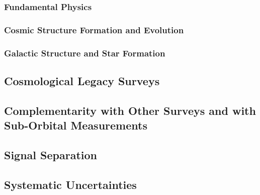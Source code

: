 \documentclass[12pt]{article}
\begin{document}
\subsubsection{Fundamental Physics} %
\label{sec:fundamentalsci}





\subsubsection{Cosmic Structure Formation and Evolution} %
\label{sec:extragalacticsci}



\subsubsection{Galactic Structure and Star Formation} %
\label{sec:galacticsci}



\subsection{Cosmological Legacy Surveys} %






\subsection{Complementarity with Other Surveys and with Sub-Orbital Measurements} %




\subsection{Signal Separation}%
\label{sec:signal_separation}




\subsection{Systematic Uncertainties}%
\end{document}
